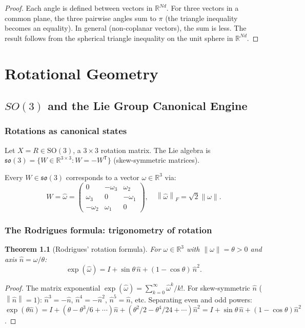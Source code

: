 \documentclass[11pt,a4paper,openany]{book}
\newtheorem{theorem}{Theorem}[chapter]
\theoremstyle{definition}
\newcommand{\R}{\mathbb{R}}
\newcommand{\T}{^{\mathsf{T}}}
\newcommand{\norm}[1]{\left\|#1\right\|}
\newcommand{\so}{\mathfrak{so}}
\newcommand{\SO}{\mathrm{SO}}
\begin{document}
\begin{proof}
Each angle is defined between vectors in $\R^{Nd}$. For three vectors in a common
plane, the three pairwise angles sum to $\pi$ (the triangle inequality becomes an equality).
In general (non-coplanar vectors), the sum is less. The result follows from the
spherical triangle inequality on the unit sphere in $\R^{Nd}$.
\end{proof}

\part{Rotational Geometry}

\chapter{$SO(3)$ and the Lie Group Canonical Engine}

\section{Rotations as canonical states}

Let $X = R \in \SO(3)$, a $3\times 3$ rotation matrix. The Lie algebra is
$\so(3) = \{W \in \R^{3\times 3} : W = -W\T\}$ (skew-symmetric matrices).

Every $W \in \so(3)$ corresponds to a vector $\omega \in \R^3$ via:
\[
W = \hat\omega = \begin{pmatrix}0 & -\omega_3 & \omega_2\\ \omega_3 & 0 & -\omega_1\\ -\omega_2 & \omega_1 & 0\end{pmatrix},
\quad\norm{\hat\omega}_F = \sqrt{2}\norm{\omega}.
\]

\section{The Rodrigues formula: trigonometry of rotation}

\begin{theorem}[Rodrigues' rotation formula]
For $\omega \in \R^3$ with $\norm{\omega} = \theta > 0$ and axis $\hat n = \omega/\theta$:
\[
\exp(\hat\omega) = I + \sin\theta\,\hat n + (1 - \cos\theta)\,\hat n^2.
\]
\end{theorem}

\begin{proof}
The matrix exponential $\exp(\hat\omega) = \sum_{k=0}^\infty \hat\omega^k/k!$.
For skew-symmetric $\hat n$ ($\norm{\hat n} = 1$): $\hat n^3 = -\hat n$, $\hat n^4 = -\hat n^2$, $\hat n^5 = \hat n$, etc.
Separating even and odd powers:
$\exp(\theta\hat n) = I + (\theta - \theta^3/6 + \cdots)\hat n + (\theta^2/2 - \theta^4/24 + \cdots)\hat n^2
= I + \sin\theta\,\hat n + (1-\cos\theta)\hat n^2$.
\end{proof}
\end{document}
